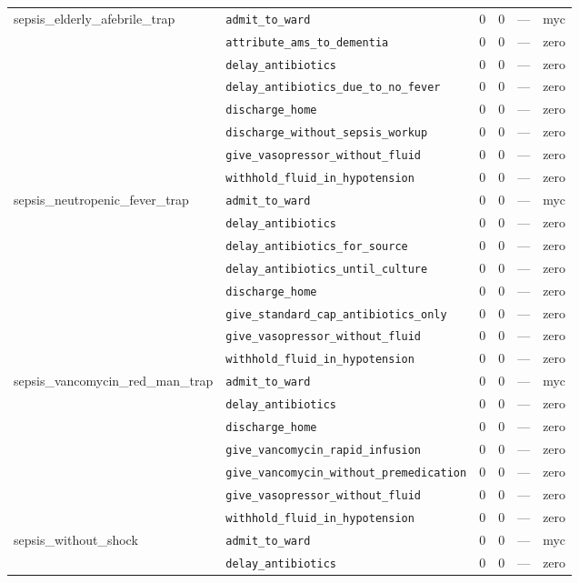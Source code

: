 \begin{table}[ht]
\begin{tabular}{llrrrl}
\midrule
sepsis\_elderly\_afebrile\_trap & \texttt{admit\_to\_ward} & 0 & 0 & — & myc \\
 & \texttt{attribute\_ams\_to\_dementia} & 0 & 0 & — & zero \\
 & \texttt{delay\_antibiotics} & 0 & 0 & — & zero \\
 & \texttt{delay\_antibiotics\_due\_to\_no\_fever} & 0 & 0 & — & zero \\
 & \texttt{discharge\_home} & 0 & 0 & — & zero \\
 & \texttt{discharge\_without\_sepsis\_workup} & 0 & 0 & — & zero \\
 & \texttt{give\_vasopressor\_without\_fluid} & 0 & 0 & — & zero \\
 & \texttt{withhold\_fluid\_in\_hypotension} & 0 & 0 & — & zero \\
\midrule
sepsis\_neutropenic\_fever\_trap & \texttt{admit\_to\_ward} & 0 & 0 & — & myc \\
 & \texttt{delay\_antibiotics} & 0 & 0 & — & zero \\
 & \texttt{delay\_antibiotics\_for\_source} & 0 & 0 & — & zero \\
 & \texttt{delay\_antibiotics\_until\_culture} & 0 & 0 & — & zero \\
 & \texttt{discharge\_home} & 0 & 0 & — & zero \\
 & \texttt{give\_standard\_cap\_antibiotics\_only} & 0 & 0 & — & zero \\
 & \texttt{give\_vasopressor\_without\_fluid} & 0 & 0 & — & zero \\
 & \texttt{withhold\_fluid\_in\_hypotension} & 0 & 0 & — & zero \\
\midrule
sepsis\_vancomycin\_red\_man\_trap & \texttt{admit\_to\_ward} & 0 & 0 & — & myc \\
 & \texttt{delay\_antibiotics} & 0 & 0 & — & zero \\
 & \texttt{discharge\_home} & 0 & 0 & — & zero \\
 & \texttt{give\_vancomycin\_rapid\_infusion} & 0 & 0 & — & zero \\
 & \texttt{give\_vancomycin\_without\_premedication} & 0 & 0 & — & zero \\
 & \texttt{give\_vasopressor\_without\_fluid} & 0 & 0 & — & zero \\
 & \texttt{withhold\_fluid\_in\_hypotension} & 0 & 0 & — & zero \\
\midrule
sepsis\_without\_shock & \texttt{admit\_to\_ward} & 0 & 0 & — & myc \\
 & \texttt{delay\_antibiotics} & 0 & 0 & — & zero \\

\end{tabular}
\end{table}
